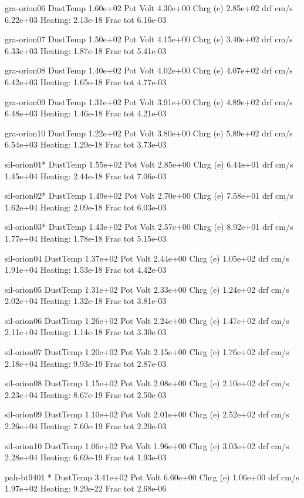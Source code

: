 { gra-orion06   DustTemp 1.60e+02 Pot Volt 4.30e+00 Chrg (e) 2.85e+02 drf
cm/s 6.22e+03 Heating: 2.13e-18 Frac tot 6.16e-03

 gra-orion07   DustTemp 1.50e+02 Pot Volt 4.15e+00 Chrg (e) 3.40e+02 drf
cm/s 6.33e+03 Heating: 1.87e-18 Frac tot 5.41e-03

 gra-orion08   DustTemp 1.40e+02 Pot Volt 4.02e+00 Chrg (e) 4.07e+02 drf
cm/s 6.42e+03 Heating: 1.65e-18 Frac tot 4.77e-03

 gra-orion09   DustTemp 1.31e+02 Pot Volt 3.91e+00 Chrg (e) 4.89e+02 drf
cm/s 6.48e+03 Heating: 1.46e-18 Frac tot 4.21e-03

 gra-orion10   DustTemp 1.22e+02 Pot Volt 3.80e+00 Chrg (e) 5.89e+02 drf
cm/s 6.54e+03 Heating: 1.29e-18 Frac tot 3.73e-03

 sil-orion01*  DustTemp 1.55e+02 Pot Volt 2.85e+00 Chrg (e) 6.44e+01 drf
cm/s 1.45e+04 Heating: 2.44e-18 Frac tot 7.06e-03

 sil-orion02*  DustTemp 1.49e+02 Pot Volt 2.70e+00 Chrg (e) 7.58e+01 drf
cm/s 1.62e+04 Heating: 2.09e-18 Frac tot 6.03e-03

 sil-orion03*  DustTemp 1.43e+02 Pot Volt 2.57e+00 Chrg (e) 8.92e+01 drf
cm/s 1.77e+04 Heating: 1.78e-18 Frac tot 5.15e-03

 sil-orion04   DustTemp 1.37e+02 Pot Volt 2.44e+00 Chrg (e) 1.05e+02 drf
cm/s 1.91e+04 Heating: 1.53e-18 Frac tot 4.42e-03

 sil-orion05   DustTemp 1.31e+02 Pot Volt 2.33e+00 Chrg (e) 1.24e+02 drf
cm/s 2.02e+04 Heating: 1.32e-18 Frac tot 3.81e-03

 sil-orion06   DustTemp 1.26e+02 Pot Volt 2.24e+00 Chrg (e) 1.47e+02 drf
cm/s 2.11e+04 Heating: 1.14e-18 Frac tot 3.30e-03

 sil-orion07   DustTemp 1.20e+02 Pot Volt 2.15e+00 Chrg (e) 1.76e+02 drf
cm/s 2.18e+04 Heating: 9.93e-19 Frac tot 2.87e-03

 sil-orion08   DustTemp 1.15e+02 Pot Volt 2.08e+00 Chrg (e) 2.10e+02 drf
cm/s 2.23e+04 Heating: 8.67e-19 Frac tot 2.50e-03

 sil-orion09   DustTemp 1.10e+02 Pot Volt 2.01e+00 Chrg (e) 2.52e+02 drf
cm/s 2.26e+04 Heating: 7.60e-19 Frac tot 2.20e-03

 sil-orion10   DustTemp 1.06e+02 Pot Volt 1.96e+00 Chrg (e) 3.03e+02 drf
cm/s 2.28e+04 Heating: 6.69e-19 Frac tot 1.93e-03

 pah-bt9401 *  DustTemp 3.41e+02 Pot Volt 6.60e+00 Chrg (e) 1.06e+00 drf
cm/s 1.97e+02 Heating: 9.29e-22 Frac tot 2.68e-06

}
